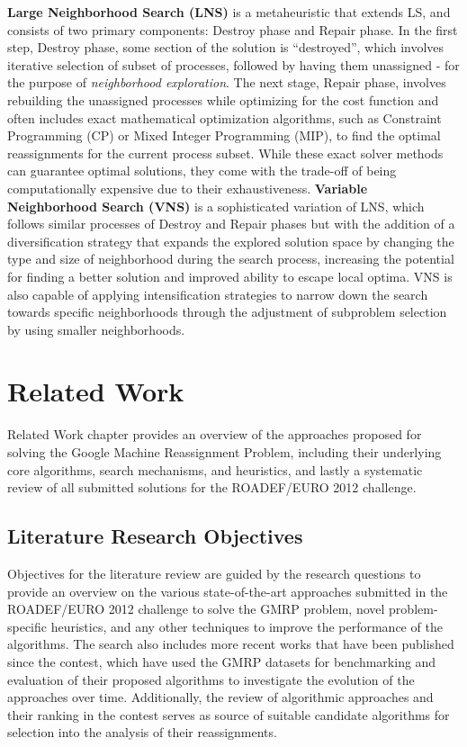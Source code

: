\documentclass[a4paper,12pt]{Classes/RoboticsLaTeX}
\begin{document}
\textbf{Large Neighborhood Search (LNS)} is a metaheuristic that extends
LS, and consists of two primary components: Destroy phase and Repair
phase. In the first step, Destroy phase, some section of the solution is
``destroyed'', which involves iterative selection of subset of
processes, followed by having them unassigned - for the purpose of
\emph{neighborhood exploration}. The next stage, Repair phase, involves
rebuilding the unassigned processes while optimizing for the cost
function and often includes exact mathematical optimization algorithms,
such as Constraint Programming (CP) or Mixed Integer Programming (MIP),
to find the optimal reassignments for the current process subset. While
these exact solver methods can guarantee optimal solutions, they come
with the trade-off of being computationally expensive due to their
exhaustiveness. \cite{pisingerLargeNeighborhoodSearch2019} \textbf{Variable Neighborhood Search (VNS)} is a
sophisticated variation of LNS, which follows similar processes of
Destroy and Repair phases but with the addition of a diversification
strategy that expands the explored solution space by changing the type
and size of neighborhood during the search process, increasing the
potential for finding a better solution and improved ability to escape
local optima. VNS is also capable of applying intensification strategies
to narrow down the search towards specific neighborhoods through the
adjustment of subproblem selection by using smaller neighborhoods. \cite{hansenVariableNeighbourhoodSearch2010}

\chapter{Related Work}\label{chap:rel_work}

Related Work chapter provides an overview of the approaches proposed for solving the Google Machine Reassignment Problem, including their underlying core algorithms, search mechanisms, and heuristics, and lastly a systematic review of all submitted solutions for the ROADEF/EURO 2012 challenge.

\section{Literature Research Objectives}

Objectives for the literature review are guided by the research questions to provide an overview on the various state-of-the-art approaches submitted in the ROADEF/EURO 2012 challenge to solve the GMRP problem, novel problem-specific heuristics, and any other techniques to improve the performance of the algorithms. 
The search also includes more recent works that have been published since the contest, which have used the GMRP datasets for benchmarking and evaluation of their proposed algorithms to investigate the evolution of the approaches over time.
Additionally, the review of algorithmic approaches and their ranking in the contest serves as source of suitable candidate algorithms for selection into the analysis of their reassignments.
\end{document}
